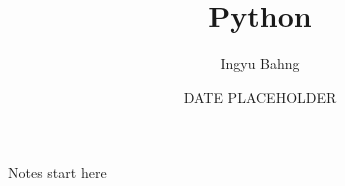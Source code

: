 \documentclass[10pt]{article}
\title{Python}
\date{DATE PLACEHOLDER}
\author{Ingyu Bahng}
\begin{document}


Notes start here
  
\end{document}
